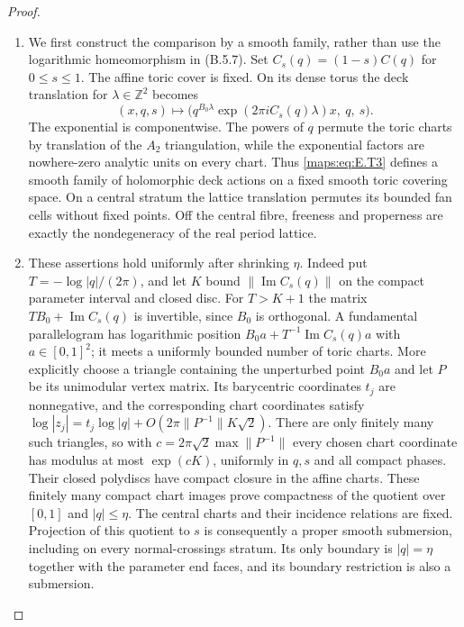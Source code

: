 \begin{proof}
\begin{enumerate}[label=\arabic*.,leftmargin=*]
\item We first construct the comparison by a smooth family, rather
than use the logarithmic homeomorphism in (B.5.7).  Set
$C_s(q)=(1-s)C(q)$ for $0\leq s\leq1$.  The affine toric cover
is fixed.  On its dense torus the deck translation for
$\lambda\in\mathbb Z^2$ becomes
\[
 (x,q,s)\longmapsto
 \bigl(q^{B_0\lambda}
       \exp(2\pi i C_s(q)\lambda)x,\ q,\ s\bigr).
 \tag{E.T3}\label{maps:eq:E.T3}
\]
The exponential is componentwise.  The powers of $q$ permute
the toric charts by translation of the $A_2$ triangulation,
while the exponential factors are nowhere-zero analytic units
on every chart.  Thus \eqref{maps:eq:E.T3} defines a smooth family of
holomorphic deck actions on a fixed smooth toric covering
space.  On a central stratum the lattice translation permutes
its bounded fan cells without fixed points.  Off the central
fibre, freeness and properness are exactly the nondegeneracy
of the real period lattice.

\item These assertions hold uniformly after shrinking $\eta$.
Indeed put $T=-\log|q|/(2\pi)$, and let $K$ bound
$\|\operatorname{Im}C_s(q)\|$ on the compact parameter interval
and closed disc.  For $T>K+1$ the matrix
$TB_0+\operatorname{Im}C_s(q)$ is invertible, since $B_0$ is
orthogonal.  A fundamental parallelogram has logarithmic
position
$B_0a+T^{-1}\operatorname{Im}C_s(q)a$ with
$a\in[0,1]^2$; it meets a uniformly bounded number of toric
charts.  More explicitly choose a triangle containing the
unperturbed point $B_0a$ and let $P$ be its unimodular vertex
matrix.  Its barycentric coordinates $t_j$ are nonnegative,
and the corresponding chart coordinates satisfy
$\log|z_j|=t_j\log|q|+
O(2\pi\|P^{-1}\|K\sqrt2)$.
There are only finitely many such triangles, so with
$c=2\pi\sqrt2\max\|P^{-1}\|$ every chosen chart coordinate
has modulus at most $\exp(cK)$, uniformly in $q,s$ and
all compact phases.  Their closed polydiscs have compact
closure in the affine charts.  These finitely many compact
chart images prove
compactness of the quotient over $[0,1]$ and $|q|\leq\eta$.
The central charts and their incidence relations are fixed.
Projection of this quotient to $s$ is consequently a proper
smooth submersion, including on every normal-crossings stratum.
Its only boundary is $|q|=\eta$ together with the parameter
end faces, and its boundary restriction is also a submersion.


\end{enumerate}
\end{proof}
